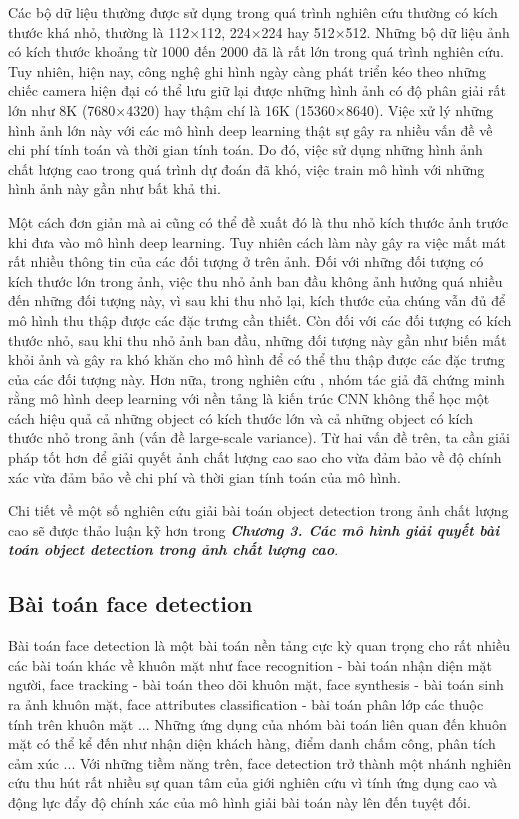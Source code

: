 {    \noindent
    Các bộ dữ liệu thường được sử dụng trong quá trình nghiên cứu thường có kích thước khá nhỏ, thường là 112×112, 224×224 hay 512×512.
    Những bộ dữ liệu ảnh có kích thước khoảng từ 1000 đến 2000 đã là rất lớn trong quá trình nghiên cứu.
    Tuy nhiên, hiện nay, công nghệ ghi hình ngày càng phát triển kéo theo những chiếc camera hiện đại có thể lưu giữ lại được những hình ảnh có độ phân giải rất lớn như 8K (7680×4320) hay thậm chí là 16K (15360×8640).
    Việc xử lý những hình ảnh lớn này với các mô hình deep learning thật sự gây ra nhiều vấn đề về chi phí tính toán và thời gian tính toán.
    Do đó, việc sử dụng những hình ảnh chất lượng cao trong quá trình dự đoán đã khó, việc train mô hình với những hình ảnh này gần như bất khả thi.

    \noindent
    Một cách đơn giản mà ai cũng có thể đề xuất đó là thu nhỏ kích thước ảnh trước khi đưa vào mô hình deep learning.
    Tuy nhiên cách làm này gây ra việc mất mát rất nhiều thông tin của các đối tượng ở trên ảnh.
    Đối với những đối tượng có kích thước lớn trong ảnh, việc thu nhỏ ảnh ban đầu không ảnh hưởng quá nhiều đến những đối tượng này, vì sau khi thu nhỏ lại, kích thước của chúng vẫn đủ để mô hình thu thập được các đặc trưng cần thiết.
    Còn đối với các đối tượng có kích thước nhỏ, sau khi thu nhỏ ảnh ban đầu, những đối tượng này gần như biến mất khỏi ảnh và gây ra khó khăn cho mô hình để có thể thu thập được các đặc trưng của các đối tượng này.
    Hơn nữa, trong nghiên cứu \cite{singh2018analysis}, nhóm tác giả đã chứng minh rằng mô hình deep learning với nền tảng là kiến trúc CNN không thể học một cách hiệu quả cả những object có kích thước lớn và cả những object có kích thước nhỏ trong ảnh (vấn đề large-scale variance).
    Từ hai vấn đề trên, ta cần giải pháp tốt hơn để giải quyết ảnh chất lượng cao sao cho vừa đảm bảo về độ chính xác vừa đảm bảo về chi phí và thời gian tính toán của mô hình.

    \noindent
    Chi tiết về một số nghiên cứu giải bài toán object detection trong ảnh chất lượng cao sẽ được thảo luận kỹ hơn trong \textbf{\textit{Chương 3. Các mô hình giải quyết bài toán object detection trong ảnh chất lượng cao}}.

    \subsection{Bài toán face detection}
    Bài toán face detection là một bài toán nền tảng cực kỳ quan trọng cho rất nhiều các bài toán khác về khuôn mặt như face recognition - bài toán nhận diện mặt người, face tracking - bài toán theo dõi khuôn mặt, face synthesis - bài toán sinh ra ảnh khuôn mặt, face attributes classification - bài toán phân lớp các thuộc tính trên khuôn mặt ...
    Những ứng dụng của nhóm bài toán liên quan đến khuôn mặt có thể kể đến như nhận diện khách hàng, điểm danh chấm công, phân tích cảm xúc ...
    Với những tiềm năng trên, face detection trở thành một nhánh nghiên cứu thu hút rất nhiều sự quan tâm của giới nghiên cứu vì tính ứng dụng cao và động lực đẩy độ chính xác của mô hình giải bài toán này lên đến tuyệt đối.
    
}
